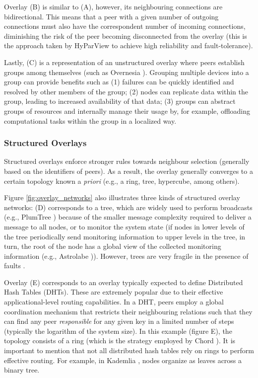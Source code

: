 Overlay (B) is similar to (A), however, its neighbouring connections are bidirectional. This means that a peer with a given number of outgoing connections must also have the correspondent number of incoming connections, diminishing the risk of the peer becoming disconnected from the overlay (this is the approach taken by HyParView \cite{Hyparview} to achieve high reliability and fault-tolerance).

Lastly, (C) is a representation of an unstructured overlay where peers establish groups among themselves (such as Overnesia \cite{leitao2014overnesia}). Grouping multiple devices into a group can provide benefits such as (1) failures can be quickly identified and resolved by other members of the group; (2) nodes can replicate data within the group, leading to increased availability of that data; (3) groups can abstract groups of resources and internally manage their usage by, for example, offloading computational tasks within the group in a localized way. 

\subsubsection*{Structured Overlays}

Structured overlays enforce stronger rules towards neighbour selection (generally based on the identifiers of peers). As a result, the overlay generally converges to a certain topology known a \textit{priori} (e.g., a ring, tree, hypercube, among others). 

Figure \ref{fig:overlay_networks} also illustrates three kinds of structured overlay networks: (D) corresponds to a tree, which are widely used to perform broadcasts (e.g., PlumTree \cite{plumTree}) because of the smaller message complexity required to deliver a message to all nodes, or to monitor the system state (if nodes in lower levels of the tree periodically send monitoring information \cite{leitao2008large} to upper levels in the tree, in turn, the root of the node has a global view of the collected monitoring information (e.g., Astrolabe \cite{Renesse2003})). However, trees are very fragile in the presence of faults \cite{plumTree}.

Overlay (E) corresponds to an overlay typically expected to define Distributed Hash Tables (DHTs). These are extremely popular due to their effective applicational-level routing capabilities. In a DHT, peers employ a global coordination mechanism that restricts their neighbouring relations such that they can find any peer \textit{responsible} for any given key in a  limited number of steps (typically the logarithm of the system size). In this example (figure E), the topology consists of a ring (which is the strategy employed by Chord \cite{stoica2003chord}). It is important to mention that not all distributed hash tables rely on rings to perform effective routing. For example, in Kademlia \cite{maymounkov2002kademlia}, nodes organize as leaves across a binary tree.

